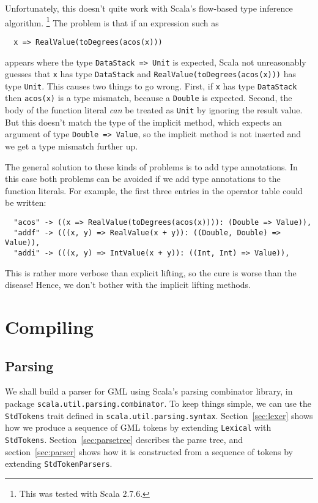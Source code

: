 Unfortunately, this doesn't quite work with
Scala's flow-based type inference algorithm.%
\footnote{This was tested with Scala 2.7.6.}
The problem is that if an expression such as
\begin{verbatim}
  x => RealValue(toDegrees(acos(x)))
\end{verbatim}
appears where the type \verb!DataStack => Unit! is expected,
Scala not unreasonably guesses that \verb!x! has type \verb!DataStack!
and \verb!RealValue(toDegrees(acos(x)))! has type \verb!Unit!.
This causes two things to go wrong.
First, if \verb!x! has type \verb!DataStack! then
\verb!acos(x)! is a type mismatch,
because a \verb!Double! is expected.
Second, the body of the function literal
\emph{can} be treated as \verb!Unit! by ignoring the result value.
But this doesn't match the type of the implicit method,
which expects an argument of type \verb!Double => Value!,
so the implicit method is not inserted and we get a type mismatch further up.

The general solution to these kinds of problems
is to add type annotations.
In this case both problems can be avoided
if we add type annotations to the function literals.
For example,
the first three entries in the operator table could be written:
\code
\begin{verbatim}
  "acos" -> ((x => RealValue(toDegrees(acos(x)))): (Double => Value)),
  "addf" -> (((x, y) => RealValue(x + y)): ((Double, Double) => Value)),
  "addi" -> (((x, y) => IntValue(x + y)): ((Int, Int) => Value)),
\end{verbatim}
\normalsize
This is rather more verbose than explicit lifting,
so the cure is worse than the disease!
Hence, we don't bother with the implicit lifting methods.


\section{Compiling\label{sec:compiling}}

\subsection{Parsing\label{sec:parsing}}

We shall build a parser for GML using Scala's parsing combinator library,
in package \verb!scala.util.parsing.combinator!.
To keep things simple,
we can use the \verb!StdTokens! trait
defined in \verb!scala.util.parsing.syntax!.
Section~\ref{sec:lexer} shows how we produce a sequence of GML tokens
by extending \verb!Lexical! with \verb!StdTokens!.
Section~\ref{sec:parsetree} describes the parse tree,
and section~\ref{sec:parser} shows
how it is constructed from a sequence of tokens
by extending \verb!StdTokenParsers!.


